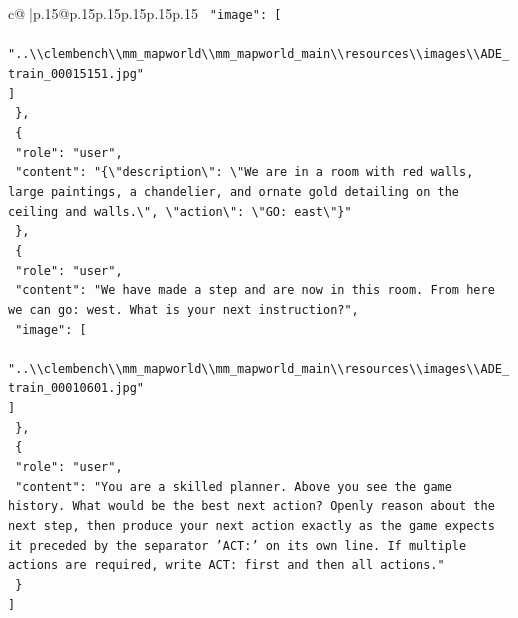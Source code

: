 \documentclass{article}
\begin{document}
{\begin{supertabular}{c@{$\;$}|p{.15\linewidth}@{}p{.15\linewidth}p{.15\linewidth}p{.15\linewidth}p{.15\linewidth}p{.15\linewidth}}
{{{\texttt{    "image": {[}} \\
\texttt{      "..\textbackslash{}\textbackslash{}clembench\textbackslash{}\textbackslash{}mm\_mapworld\textbackslash{}\textbackslash{}mm\_mapworld\_main\textbackslash{}\textbackslash{}resources\textbackslash{}\textbackslash{}images\textbackslash{}\textbackslash{}ADE\_train\_00015151.jpg"} \\
\texttt{    {]}} \\
\texttt{  \},} \\
\texttt{  \{} \\
\texttt{    "role": "user",} \\
\texttt{    "content": "\{\textbackslash{}"description\textbackslash{}": \textbackslash{}"We are in a room with red walls, large paintings, a chandelier, and ornate gold detailing on the ceiling and walls.\textbackslash{}", \textbackslash{}"action\textbackslash{}": \textbackslash{}"GO: east\textbackslash{}"\}"} \\
\texttt{  \},} \\
\texttt{  \{} \\
\texttt{    "role": "user",} \\
\texttt{    "content": "We have made a step and are now in this room. From here we can go: west. What is your next instruction?",} \\
\texttt{    "image": {[}} \\
\texttt{      "..\textbackslash{}\textbackslash{}clembench\textbackslash{}\textbackslash{}mm\_mapworld\textbackslash{}\textbackslash{}mm\_mapworld\_main\textbackslash{}\textbackslash{}resources\textbackslash{}\textbackslash{}images\textbackslash{}\textbackslash{}ADE\_train\_00010601.jpg"} \\
\texttt{    {]}} \\
\texttt{  \},} \\
\texttt{  \{} \\
\texttt{    "role": "user",} \\
\texttt{    "content": "You are a skilled planner. Above you see the game history. What would be the best next action? Openly reason about the next step, then produce your next action exactly as the game expects it preceded by the separator 'ACT:' on its own line. If multiple actions are required, write ACT: first and then all actions."} \\
\texttt{  \}} \\
\texttt{{]}} \\
            }
        }
    }
     \\ \\


\end{supertabular}}
\end{document}
